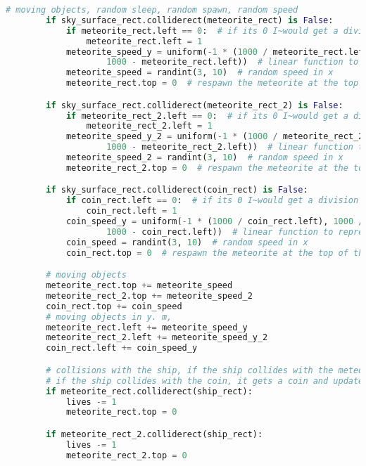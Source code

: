 \documentclass[12pt]{report}			%
\begin{document}
\begin{appendices}
\begin{lstlisting}[title={Program hra.py}, caption={hra.py},  label={lst:hra}, language=Python]
        # moving objects, random sleep, random spawn, random speed
        if sky_surface_rect.colliderect(meteorite_rect) is False:
            if meteorite_rect.left == 0:  # if its 0 I~would get a division by 0 error
                meteorite_rect.left = 1
            meteorite_speed_y = uniform(-1 * (1000 / meteorite_rect.left), 1000 / (
                    1000 - meteorite_rect.left))  # linear function to represent the direction of the meteorite
            meteorite_speed = randint(3, 10)  # random speed in x
            meteorite_rect.top = 0  # respawn the meteorite at the top of the screen

        if sky_surface_rect.colliderect(meteorite_rect_2) is False:
            if meteorite_rect_2.left == 0:  # if its 0 I~would get a division by 0 error
                meteorite_rect_2.left = 1
            meteorite_speed_y_2 = uniform(-1 * (1000 / meteorite_rect_2.left), 1000 / (
                    1000 - meteorite_rect_2.left))  # linear function to represent the direction of the meteorite
            meteorite_speed_2 = randint(3, 10)  # random speed in x
            meteorite_rect_2.top = 0  # respawn the meteorite at the top of the screen

        if sky_surface_rect.colliderect(coin_rect) is False:
            if coin_rect.left == 0:  # if its 0 I~would get a division by 0 error
                coin_rect.left = 1
            coin_speed_y = uniform(-1 * (1000 / coin_rect.left), 1000 / (
                    1000 - coin_rect.left))  # linear function to represent the direction of the meteorite
            coin_speed = randint(3, 10)  # random speed in x
            coin_rect.top = 0  # respawn the meteorite at the top of the screen

        # moving objects
        meteorite_rect.top += meteorite_speed
        meteorite_rect_2.top += meteorite_speed_2
        coin_rect.top += coin_speed
        # moving objects in y. m,
        meteorite_rect.left += meteorite_speed_y
        meteorite_rect_2.left += meteorite_speed_y_2
        coin_rect.left += coin_speed_y

        # collisions with the ship, if the ship collides with the meteorite, it loses a life
        # if the ship collides with the coin, it gets a coin and updates the score
        if meteorite_rect.colliderect(ship_rect):
            lives -= 1
            meteorite_rect.top = 0

        if meteorite_rect_2.colliderect(ship_rect):
            lives -= 1
            meteorite_rect_2.top = 0


\end{lstlisting}
\end{appendices}
\end{document}
